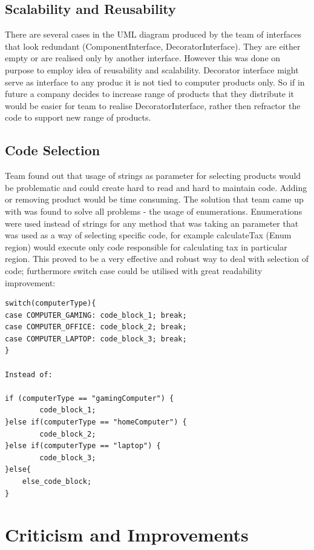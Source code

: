 \documentclass[pdftex,11pt,a4paper]{article}
\begin{document}
\subsection{Scalability and Reusability}
There are several cases in the UML diagram produced by the team of interfaces that look redundant (ComponentInterface, DecoratorInterface). They are either empty or are realised only by another interface. However this was done on purpose to employ idea of reusability and scalability. Decorator interface might serve as interface to any produc it is not tied to computer products only. So if in future a company decides to increase range of products that they distribute it would be easier for team to realise DecoratorInterface, rather then refractor the code to support new range of products. 

\subsection{Code Selection}
Team found out that usage of strings as parameter for selecting products would be problematic and could create hard to read and hard to maintain code. Adding or removing product would be time consuming. The solution that team came up with was found to solve all problems - the usage of enumerations. Enumerations were used instead of strings for any method that was taking an parameter that was used as a way of selecting specific code, for example calculateTax (Enum region) would execute only code responsible for calculating tax in particular region. This proved to be a very effective and robust way to deal with selection of code; furthermore switch case could be utilised with great readability improvement:


\begin{lstlisting}
switch(computerType){
case COMPUTER_GAMING: code_block_1; break;	
case COMPUTER_OFFICE: code_block_2; break;
case COMPUTER_LAPTOP: code_block_3; break;
}

Instead of:
	
if (computerType == "gamingComputer") {
		code_block_1;
}else if(computerType == "homeComputer") {
		code_block_2;
}else if(computerType == "laptop") {
		code_block_3;
}else{
	else_code_block;
}
\end{lstlisting}

\pagebreak

\section{Criticism and Improvements}
\end{document}

